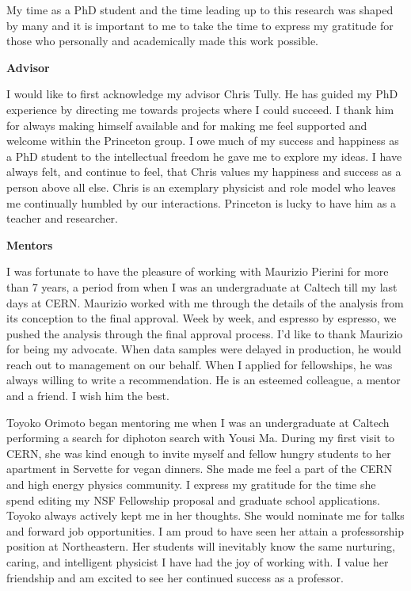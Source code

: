 My time as a PhD student and the time leading up to this research was shaped by many and it is important 
to me to take the time to express my gratitude for those who personally and academically made this work possible.

\begin{center} \textbf{Advisor} \end{center}

I would like to first acknowledge my advisor Chris Tully. He has guided my PhD experience
by directing me towards projects where I could succeed. I thank him  for always making himself available and
for making me feel supported and welcome within the Princeton group.  I owe much of my success and happiness 
as a PhD student to the intellectual freedom he gave me to explore my ideas. I have always 
felt, and continue to feel, that Chris values my happiness and success as a person above all
else. Chris is an exemplary physicist and role model who leaves me continually humbled
 by our interactions. Princeton is lucky to have him as a teacher and researcher. 

\begin{center} \textbf{Mentors} \end{center}

I was fortunate to have  the pleasure of working with Maurizio Pierini for more than
 7 years, a period from when 
I was an undergraduate at Caltech till my last days at CERN. Maurizio worked with me through
the details of the analysis from its conception
to the final approval. Week by week, and espresso by espresso, we pushed the analysis through
the final approval process.  I'd like to thank Maurizio for being my advocate. When data samples were delayed in 
production, he would reach out to management on our behalf. When I applied for fellowships, he 
was always willing to write a recommendation. He is an esteemed colleague, a mentor and 
a friend. I wish him the best.

Toyoko Orimoto began mentoring me when I was an undergraduate at Caltech
performing a search for diphoton search with Yousi Ma. During my first visit to CERN, she was kind
 enough to invite myself and fellow hungry students to her apartment in Servette for vegan dinners. 
She made me feel a part of the CERN and high energy physics community. I express my gratitude 
for the time she spend editing 
my NSF Fellowship proposal and graduate school applications. Toyoko always actively kept me in her thoughts. 
She would nominate me for talks and forward job opportunities.
I am proud to have seen her attain a professorship position at Northeastern. Her students will inevitably 
know the same nurturing, caring, and intelligent physicist I have had the joy of working with. I value her friendship and am excited to see
 her continued success as a professor.

